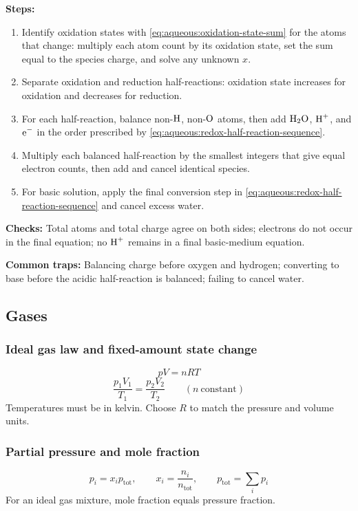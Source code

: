 \textbf{Steps:}
\begin{enumerate}
    \item Identify oxidation states with \eqref{eq:aqueous:oxidation-state-sum} for the atoms that change: multiply each atom count by its oxidation state, set the sum equal to the species charge, and solve any unknown \(x\).
    \item Separate oxidation and reduction half-reactions: oxidation state increases for oxidation and decreases for reduction.
    \item For each half-reaction, balance non-\(\ce{H}\), non-\(\ce{O}\) atoms, then add \(\ce{H2O}\), \(\ce{H+}\), and \(\ce{e-}\) in the order prescribed by \eqref{eq:aqueous:redox-half-reaction-sequence}.
    \item Multiply each balanced half-reaction by the smallest integers that give equal electron counts, then add and cancel identical species.
    \item For basic solution, apply the final conversion step in \eqref{eq:aqueous:redox-half-reaction-sequence} and cancel excess water.
\end{enumerate}

\textbf{Checks:} Total atoms and total charge agree on both sides; electrons do not occur in the final equation; no \(\ce{H+}\) remains in a final basic-medium equation.

\textbf{Common traps:} Balancing charge before oxygen and hydrogen; converting to base before the acidic half-reaction is balanced; failing to cancel water.

\subsection{Gases}

\subsubsection{Ideal gas law and fixed-amount state change}
\begin{equation}\label{eq:aqueous:ideal-gas-law}
pV=nRT
\end{equation}
\begin{equation}\label{eq:aqueous:combined-gas-law}
\frac{p_1V_1}{T_1}=\frac{p_2V_2}{T_2}\qquad(n\ \text{constant})
\end{equation}
Temperatures must be in kelvin. Choose \(R\) to match the pressure and volume units.

\subsubsection{Partial pressure and mole fraction}
\begin{equation}\label{eq:aqueous:dalton-law}
p_i=x_ip_{\mathrm{tot}}, \qquad x_i=\frac{n_i}{n_{\mathrm{tot}}}, \qquad p_{\mathrm{tot}}=\sum_i p_i
\end{equation}
For an ideal gas mixture, mole fraction equals pressure fraction.

